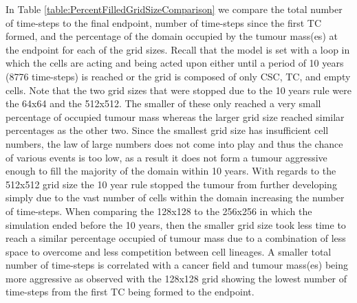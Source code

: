 \documentclass[\main/thesis.tex]{subfiles}
\begin{document}
In Table \ref{table:PercentFilledGridSizeComparison} we compare the total number of time-steps to the final endpoint, number of time-steps since the first TC formed, and the percentage of the domain occupied by the tumour mass(es) at the endpoint for each of the grid sizes. Recall that the model is set with a loop in which the cells are acting and being acted upon either until a period of 10 years (8776 time-steps) is reached or the grid is composed of only CSC, TC, and empty cells. Note that the two grid sizes that were stopped due to the 10 years rule were the 64x64 and the 512x512. The smaller of these only reached a very small percentage of occupied tumour mass whereas the larger grid size reached similar percentages as the other two. Since the smallest grid size has insufficient cell numbers, the law of large numbers does not come into play and thus the chance of various events is too low, as a result it does not form a tumour aggressive enough to fill the majority of the domain within 10 years. With regards to the 512x512 grid size the 10 year rule stopped the tumour from further developing simply due to the vast number of cells within the domain increasing the number of time-steps. When comparing the 128x128 to the 256x256 in which the simulation ended before the 10 years, then the smaller grid size took less time to reach a similar percentage occupied of tumour mass due to a combination of less space to overcome and less competition between cell lineages. A smaller total number of time-steps is correlated with a cancer field and tumour mass(es) being more aggressive as observed with the 128x128 grid showing the lowest number of time-steps from the first TC being formed to the endpoint.
\begin{table}[H]
\centering
{}
\caption{This table compares the total number of time-steps, number of time-steps since the first TC formed, and the percentage the tumour mass(es) make up of the domain at the end of the simulation between all the grid sizes.}
\label{table:PercentFilledGridSizeComparison} 
\end{table}
\end{document}
